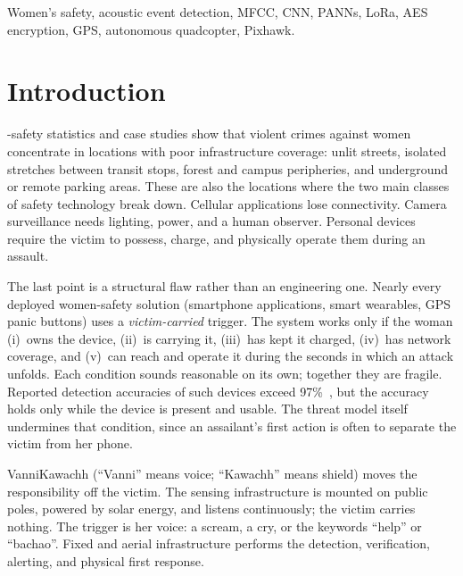 \documentclass[journal]{IEEEtran}
\begin{document}
\begin{IEEEkeywords}
Women's safety, acoustic event detection, MFCC, CNN, PANNs, LoRa, AES
encryption, GPS, autonomous quadcopter, Pixhawk.
\end{IEEEkeywords}

\IEEEpeerreviewmaketitle

\section{Introduction}

-safety statistics and case studies show that violent
crimes against women concentrate in locations with poor infrastructure
coverage: unlit streets, isolated stretches between transit stops, forest and
campus peripheries, and underground or remote parking areas. These are also
the locations where the two main classes of safety technology break down.
Cellular applications lose connectivity. Camera surveillance needs lighting,
power, and a human observer. Personal devices require the victim to possess,
charge, and physically operate them during an assault.

The last point is a structural flaw rather than an engineering one. Nearly
every deployed women-safety solution (smartphone applications, smart
wearables, GPS panic buttons) uses a \emph{victim-carried} trigger. The
system works only if the woman (i)~owns the device, (ii)~is carrying it,
(iii)~has kept it charged, (iv)~has network coverage, and (v)~can reach and
operate it during the seconds in which an attack unfolds. Each condition
sounds reasonable on its own; together they are fragile. Reported detection
accuracies of such devices exceed 97\%~\cite{bharathi2025}, but the accuracy
holds only while the device is present and usable. The threat model itself
undermines that condition, since an assailant's first action is often to
separate the victim from her phone.

VanniKawachh (``Vanni'' means voice; ``Kawachh'' means shield) moves the
responsibility off the victim. The sensing infrastructure is mounted on
public poles, powered by solar energy, and listens continuously; the victim
carries nothing. The trigger is her voice: a scream, a cry, or the keywords
``help'' or ``bachao''. Fixed and aerial infrastructure performs the
detection, verification, alerting, and physical first response.
\end{document}
